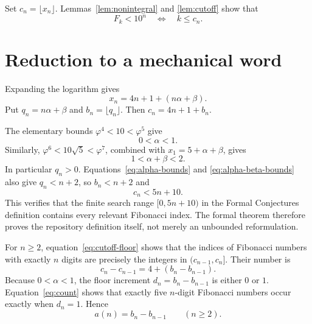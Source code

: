 \documentclass[11pt]{article}
\newcommand{\fib}{F}
\begin{document}
Set $c_n=\lfloor x_n\rfloor$.  Lemmas~\ref{lem:nonintegral} and
\ref{lem:cutoff} show that
\begin{equation}\label{eq:cutoff-floor}
 \fib_k<10^n \quad\Longleftrightarrow\quad k\leq c_n.
\end{equation}

\section{Reduction to a mechanical word}

Expanding the logarithm gives
\begin{equation}\label{eq:affine}
 x_n=4n+1+(n\alpha+\beta).
\end{equation}
Put $q_n=n\alpha+\beta$ and $b_n=\lfloor q_n\rfloor$.  Then
$c_n=4n+1+b_n$.

The elementary bounds $\varphi^4<10<\varphi^5$ give
\begin{equation}\label{eq:alpha-bounds}
 0<\alpha<1.
\end{equation}
Similarly, $\varphi^6<10\sqrt5<\varphi^7$, combined with
$x_1=5+\alpha+\beta$, gives
\begin{equation}\label{eq:alpha-beta-bounds}
 1<\alpha+\beta<2.
\end{equation}
In particular $q_n>0$.  Equations~\eqref{eq:alpha-bounds} and
\eqref{eq:alpha-beta-bounds} also give $q_n<n+2$, so $b_n<n+2$ and
\begin{equation}\label{eq:finite-cutoff}
 c_n<5n+10.
\end{equation}
This verifies that the finite search range $[0,5n+10)$ in the Formal
Conjectures definition contains every relevant Fibonacci index.  The formal
theorem therefore proves the repository definition itself, not merely an
unbounded reformulation.

For $n\geq2$, equation~\eqref{eq:cutoff-floor} shows that the indices of
Fibonacci numbers with exactly $n$ digits are precisely the integers in
$(c_{n-1},c_n]$.  Their number is
\begin{equation}\label{eq:count}
 c_n-c_{n-1}=4+(b_n-b_{n-1}).
\end{equation}
Because $0<\alpha<1$, the floor increment
$d_n=b_n-b_{n-1}$ is either $0$ or $1$.  Equation~\eqref{eq:count} shows that
exactly five $n$-digit Fibonacci numbers occur exactly when $d_n=1$.  Hence
\begin{equation}\label{eq:a-difference}
 a(n)=b_n-b_{n-1}\qquad(n\geq2).
\end{equation}
\end{document}

